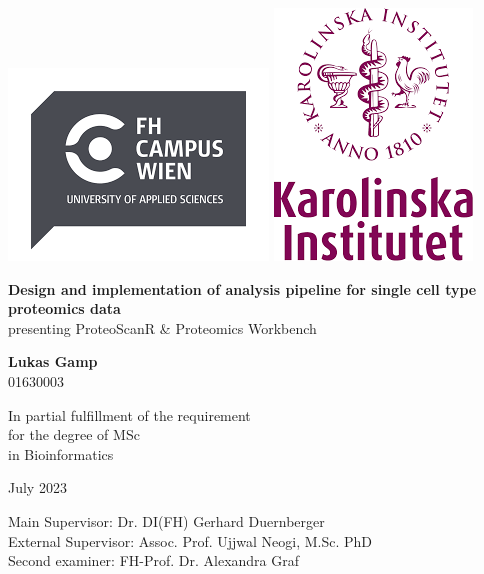 \documentclass[
  11pt,
]{article}
\author{}
\date{\vspace{-2.5em}}
\begin{document}
\allsectionsfont{\centering}
\subsectionfont{\raggedright}
\subsubsectionfont{\raggedright}


\begin{centering}

\vspace{3cm}

\includegraphics[width=0.2\linewidth]{FHCW_logo} 
\includegraphics[width=0.2\linewidth]{KI_logo} 

\vspace{1cm}

\Large
\doublespacing
{\bf Design and implementation of analysis pipeline for single cell type proteomics data} 
\\ presenting ProteoScanR \& Proteomics Workbench

\vspace{1 cm}

\normalsize
\singlespacing

\vspace{0.5 cm}

\Large

{\bf Lukas Gamp}
\\ 01630003

\vspace{1.5 cm}

In partial fulfillment of the requirement \\for the degree of MSc \\in Bioinformatics

\vspace{1.5 cm}

\normalsize
July 2023

\doublespacing
\doublespacing
Main Supervisor: Dr. DI(FH) Gerhard Duernberger \\
External Supervisor: Assoc. Prof. Ujjwal Neogi, M.Sc. PhD \\
Second examiner: FH-Prof. Dr. Alexandra Graf \\

\end{centering}
\end{document}
